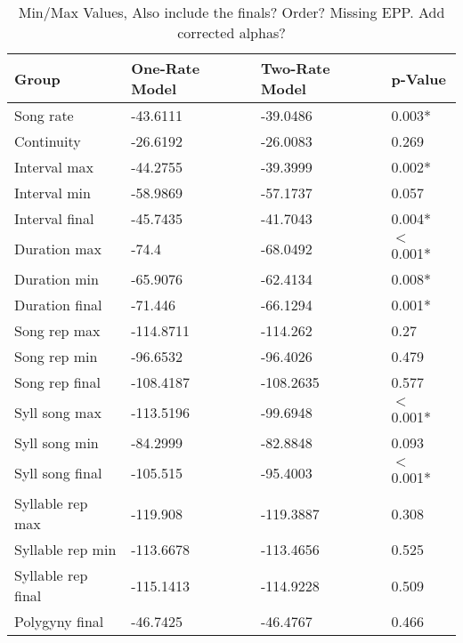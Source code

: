 \documentclass{article}\usepackage[]{graphicx}\usepackage[]{color}
\begin{document}
\begin{table}[ht]
\centering
\caption{Min/Max Values, Also include the finals?  Order? Missing EPP. Add corrected alphas?}
\begin{tabular}{llll}
  \hline
Group & One-Rate Model & Two-Rate Model & p-Value \\ 
  \hline
Song rate & -43.6111 & -39.0486 & 0.003* \\ 
  Continuity & -26.6192 & -26.0083 & 0.269 \\ 
  Interval max & -44.2755 & -39.3999 & 0.002* \\ 
  Interval min & -58.9869 & -57.1737 & 0.057 \\ 
  Interval final & -45.7435 & -41.7043 & 0.004* \\ 
  Duration max & -74.4 & -68.0492 & $<$0.001* \\ 
  Duration min & -65.9076 & -62.4134 & 0.008* \\ 
  Duration final & -71.446 & -66.1294 & 0.001* \\ 
  Song rep max & -114.8711 & -114.262 & 0.27 \\ 
  Song rep min & -96.6532 & -96.4026 & 0.479 \\ 
  Song rep final & -108.4187 & -108.2635 & 0.577 \\ 
  Syll song max & -113.5196 & -99.6948 & $<$0.001* \\ 
  Syll song min & -84.2999 & -82.8848 & 0.093 \\ 
  Syll song final & -105.515 & -95.4003 & $<$0.001* \\ 
  Syllable rep max & -119.908 & -119.3887 & 0.308 \\ 
  Syllable rep min & -113.6678 & -113.4656 & 0.525 \\ 
  Syllable rep final & -115.1413 & -114.9228 & 0.509 \\ 
  Polygyny final & -46.7425 & -46.4767 & 0.466 \\ 
   \hline
\end{tabular}
\end{table}
\end{document}
